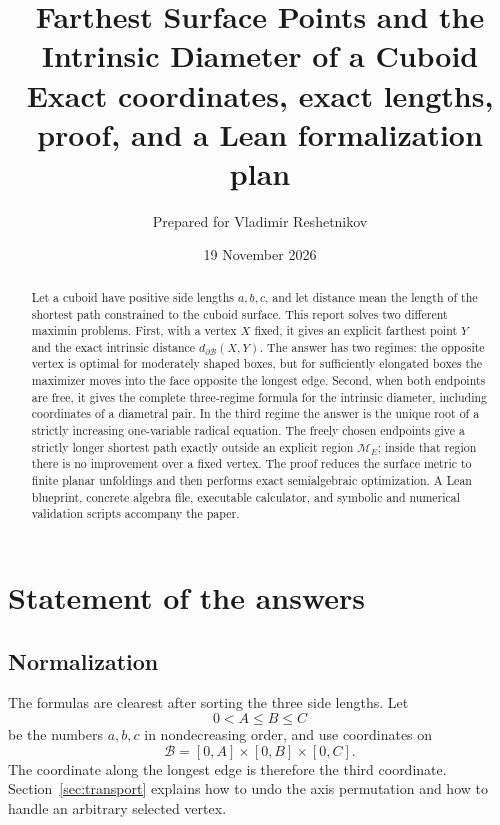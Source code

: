 \documentclass[11pt]{article}
\title{\textbf{Farthest Surface Points and the Intrinsic Diameter of a Cuboid}\\
\large Exact coordinates, exact lengths, proof, and a Lean formalization plan}
\author{Prepared for Vladimir Reshetnikov}
\date{19 November 2026}
\theoremstyle{definition}
\newcommand{\Surf}{\partial\mathcal B}
\newcommand{\distS}{d_{\Surf}}
\begin{document}
\maketitle

\begin{abstract}
Let a cuboid have positive side lengths $a,b,c$, and let distance mean the
length of the shortest path constrained to the cuboid surface.  This report
solves two different maximin problems.  First, with a vertex $X$ fixed, it
gives an explicit farthest point $Y$ and the exact intrinsic distance
$\distS(X,Y)$.  The answer has two regimes: the opposite vertex is optimal for
moderately shaped boxes, but for sufficiently elongated boxes the maximizer
moves into the face opposite the longest edge.  Second, when both endpoints
are free, it gives the complete three-regime formula for the intrinsic
diameter, including coordinates of a diametral pair.  In the third regime the
answer is the unique root of a strictly increasing one-variable radical
equation.  The freely chosen endpoints give a strictly longer shortest path
exactly outside an explicit region $\mathcal M_E$; inside that region there is
no improvement over a fixed vertex.  The proof reduces the surface metric to
finite planar unfoldings and then performs exact semialgebraic optimization.
A Lean blueprint, concrete algebra file, executable calculator, and symbolic
and numerical validation scripts accompany the paper.
\end{abstract}

\tableofcontents

\section{Statement of the answers}

\subsection{Normalization}

The formulas are clearest after sorting the three side lengths.  Let
\begin{equation}\label{eq:sort}
  0<A\le B\le C
\end{equation}
be the numbers $a,b,c$ in nondecreasing order, and use coordinates on
\begin{equation}
  \mathcal B=[0,A]\times[0,B]\times[0,C].
\end{equation}
The coordinate along the longest edge is therefore the third coordinate.
Section~\ref{sec:transport} explains how to undo the axis permutation and how
to handle an arbitrary selected vertex.
\end{document}
